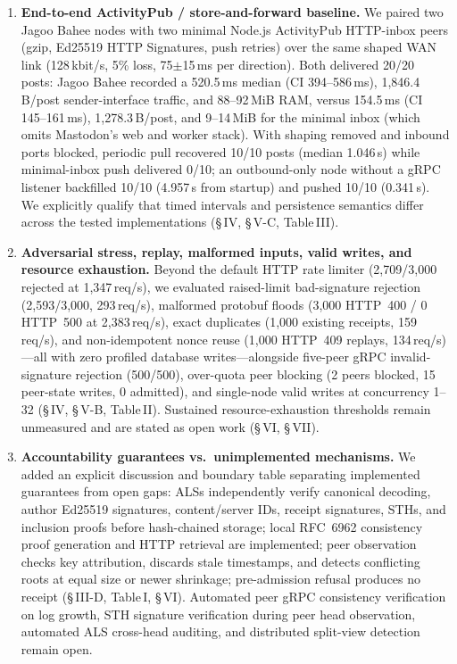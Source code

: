 \documentclass[10pt,a4paper]{article}
\begin{document}
\begin{enumerate}
  \item \textbf{End-to-end ActivityPub / store-and-forward baseline.}
  We paired two Jagoo Bahee nodes with two minimal Node.js ActivityPub HTTP-inbox peers (gzip, Ed25519 HTTP Signatures, push retries) over the same shaped WAN link (128\,kbit/s, 5\% loss, 75$\pm$15\,ms per direction). Both delivered 20/20 posts: Jagoo Bahee recorded a 520.5\,ms median (CI 394--586\,ms), 1,846.4\,B/post sender-interface traffic, and 88--92\,MiB RAM, versus 154.5\,ms (CI 145--161\,ms), 1,278.3\,B/post, and 9--14\,MiB for the minimal inbox (which omits Mastodon's web and worker stack). With shaping removed and inbound ports blocked, periodic pull recovered 10/10 posts (median 1.046\,s) while minimal-inbox push delivered 0/10; an outbound-only node without a gRPC listener backfilled 10/10 (4.957\,s from startup) and pushed 10/10 (0.341\,s). We explicitly qualify that timed intervals and persistence semantics differ across the tested implementations (\S\,IV, \S\,V-C, Table\,III).

  \item \textbf{Adversarial stress, replay, malformed inputs, valid writes, and resource exhaustion.}
  Beyond the default HTTP rate limiter (2,709/3,000 rejected at 1,347\,req/s), we evaluated raised-limit bad-signature rejection (2,593/3,000, 293\,req/s), malformed protobuf floods (3,000 HTTP~400 / 0 HTTP~500 at 2,383\,req/s), exact duplicates (1,000 existing receipts, 159\,req/s), and non-idempotent nonce reuse (1,000 HTTP~409 replays, 134\,req/s)---all with zero profiled database writes---alongside five-peer gRPC invalid-signature rejection (500/500), over-quota peer blocking (2 peers blocked, 15 peer-state writes, 0 admitted), and single-node valid writes at concurrency 1--32 (\S\,IV, \S\,V-B, Table\,II). Sustained resource-exhaustion thresholds remain unmeasured and are stated as open work (\S\,VI, \S\,VII).

  \item \textbf{Accountability guarantees vs.\ unimplemented mechanisms.}
  We added an explicit discussion and boundary table separating implemented guarantees from open gaps: ALSs independently verify canonical decoding, author Ed25519 signatures, content/server IDs, receipt signatures, STHs, and inclusion proofs before hash-chained storage; local RFC~6962 consistency proof generation and HTTP retrieval are implemented; peer observation checks key attribution, discards stale timestamps, and detects conflicting roots at equal size or newer shrinkage; pre-admission refusal produces no receipt (\S\,III-D, Table\,I, \S\,VI). Automated peer gRPC consistency verification on log growth, STH signature verification during peer head observation, automated ALS cross-head auditing, and distributed split-view detection remain open.


\end{enumerate}
\end{document}
